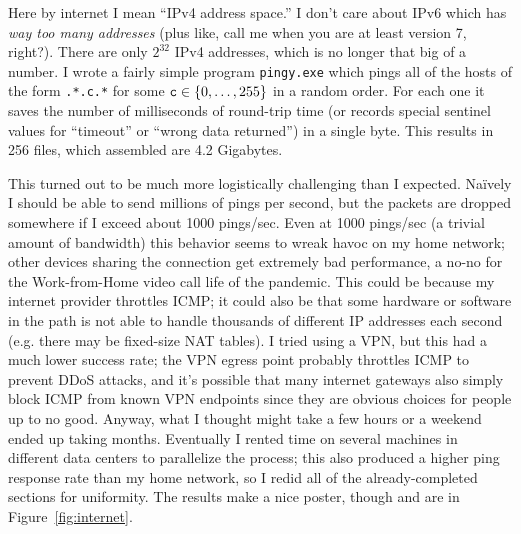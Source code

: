 \documentclass[twocolumn]{article}
\begin{document}
Here by internet I mean ``IPv4 address space.'' I don't care about
IPv6 which has {\it way too many addresses} (plus like, call me when
you are at least version 7, right?). There are only $2^{32}$ IPv4
addresses, which is no longer that big of a number. I wrote a fairly
simple program {\tt pingy.exe} which pings all of the hosts of the
form {\tt *.*.c.*} for some ${\tt c} \in \{0,\ldots,255\}$ in a random
order. For each one it saves the number of milliseconds of round-trip
time (or records special sentinel values for ``timeout'' or ``wrong
data returned'') in a single byte. This results in 256 files, which
assembled are 4.2 Gigabytes.

This turned out to be much more logistically challenging than I
expected. Na\"ively I should be able to send millions of pings per
second, but the packets are dropped somewhere if I exceed about 1000
pings/sec. Even at 1000 pings/sec (a trivial amount of bandwidth) this
behavior seems to wreak havoc on my home network; other devices
sharing the connection get extremely bad performance, a no-no for the
Work-from-Home video call life of the pandemic. This could be because
my internet provider throttles ICMP; it could also be that some
hardware or software in the path is not able to handle thousands of
different IP addresses each second (e.g. there may be fixed-size NAT
tables). I tried using a VPN, but this had a much lower success rate;
the VPN egress point probably throttles ICMP to prevent DDoS attacks,
and it's possible that many internet gateways also simply block ICMP
from known VPN endpoints since they are obvious choices for people up
to no good. Anyway, what I thought might take a few hours or a weekend
ended up taking months. Eventually I rented time on several machines
in different data centers to parallelize the process; this also
produced a higher ping response rate than my home network, so I redid
all of the already-completed sections for uniformity. The results make
a nice poster, though and are in Figure~\ref{fig:internet}.
\end{document}
